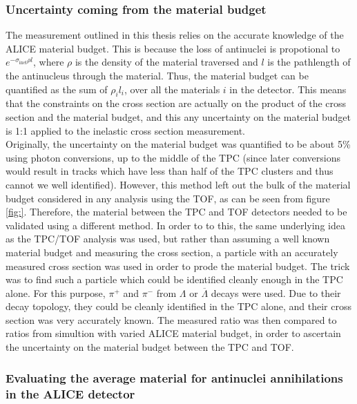 \subsubsection{Uncertainty coming from the material budget}
The measurement outlined in this thesis relies on the accurate knowledge of the ALICE material budget. This is because the loss of antinuclei is propotional to $e^{-\sigma_\mathrm{inel} \rho l}$, where $\rho$ is the density of the material traversed and $l$ is the pathlength of the antinucleus through the material. Thus, the material budget can be quantified as the sum of $\rho_i l_i$, over all the materials $i$ in the detector. This means that the constraints on the cross section are actually on the product of the cross section and the material budget, and this any uncertainty on the material budget is 1:1 applied to the inelastic cross section measurement. \\

Originally, the uncertainty on the material budget was quantified to be about 5\% using photon conversions\cite{}, up to the middle of the TPC (since later conversions would result in tracks which have less than half of the TPC clusters and thus cannot we well identified). However, this method left out the bulk of the material budget considered in any analysis using the TOF, as can be seen from figure \ref{fig:}. Therefore, the material between the TPC and TOF detectors needed to be validated using a different method. In order to to this, the same underlying idea as the TPC/TOF analysis was used, but rather than assuming a well known material budget and measuring the cross section, a particle with an accurately measured cross section was used in order to prode the material budget. The trick was to find such a particle which could be identified cleanly enough in the TPC alone. For this purpose, $\pi^+$ and $\pi^-$ from $\Lambda$ or $\overline{\Lambda}$ decays were used. Due to their decay topology, they could be cleanly identified in the TPC alone, and their cross section was very accurately known. The measured ratio was then compared to ratios from simultion with varied ALICE material budget, in order to ascertain the uncertainty on the material budget between the TPC and TOF. 
\subsubsection{Evaluating the average material for antinuclei annihilations in the ALICE detector}
